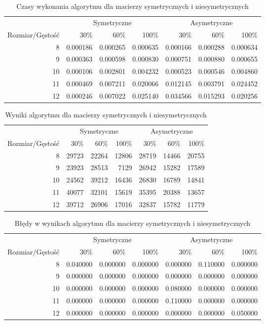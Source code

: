 \begin{table}[ht]
\centering
\begin{tabular}{rrrrrrr}
\toprule
 & \multicolumn{3}{c}{Symetryczne} & \multicolumn{3}{c}{Asymetryczne} \\
Rozmiar/Gęstość & 30\% & 60\% & 100\% & 30\% & 60\% & 100\% \\
\midrule
8 & 0.000186 & 0.000265 & 0.000635 & 0.000166 & 0.000288 & 0.000634 \\
9 & 0.000363 & 0.000598 & 0.000830 & 0.000751 & 0.000880 & 0.000655 \\
10 & 0.000106 & 0.002801 & 0.004232 & 0.000523 & 0.000546 & 0.004860 \\
11 & 0.000469 & 0.007211 & 0.020066 & 0.012145 & 0.003791 & 0.024452 \\
12 & 0.000246 & 0.007022 & 0.025140 & 0.034566 & 0.015293 & 0.020256 \\
\bottomrule
\end{tabular}
\caption{Czasy wykonania algorytmu dla macierzy symetrycznych i niesymetrycznych}
\label{tab:mean_time_dfsresoult}
\end{table}
\begin{table}[ht]
\centering
\begin{tabular}{rrrrrrr}
\toprule
 & \multicolumn{3}{c}{Symetryczne} & \multicolumn{3}{c}{Asymetryczne} \\
Rozmiar/Gęstość & 30\% & 60\% & 100\% & 30\% & 60\% & 100\% \\
\midrule
8 & 29723 & 22264 & 12806 & 28719 & 14466 & 20755 \\
9 & 23923 & 28513 & 7129 & 26942 & 15282 & 17589 \\
10 & 24562 & 39212 & 16436 & 26830 & 16789 & 14841 \\
11 & 40077 & 32101 & 15619 & 35395 & 20388 & 13657 \\
12 & 39712 & 26906 & 17016 & 32837 & 15782 & 11779 \\
\bottomrule
\end{tabular}
\caption{Wyniki algorytmu dla macierzy symetrycznych i niesymetrycznych}
\label{tab:resoult_dfsresoult}
\end{table}
\begin{table}[ht]
\centering
\begin{tabular}{rrrrrrr}
\toprule
 & \multicolumn{3}{c}{Symetryczne} & \multicolumn{3}{c}{Asymetryczne} \\
Rozmiar/Gęstość & 30\% & 60\% & 100\% & 30\% & 60\% & 100\% \\
\midrule
8 & 0.040000 & 0.000000 & 0.000000 & 0.000000 & 0.110000 & 0.000000 \\
9 & 0.000000 & 0.000000 & 0.000000 & 0.000000 & 0.000000 & 0.000000 \\
10 & 0.000000 & 0.000000 & 0.000000 & 0.080000 & 0.000000 & 0.000000 \\
11 & 0.000000 & 0.000000 & 0.000000 & 0.110000 & 0.000000 & 0.000000 \\
12 & 0.000000 & 0.000000 & 0.000000 & 0.000000 & 0.000000 & 0.050000 \\
\bottomrule
\end{tabular}
\caption{Błędy w wynikach algorytmu dla macierzy symetrycznych i niesymetrycznych}
\label{tab:error_dfsresoult}
\end{table}
